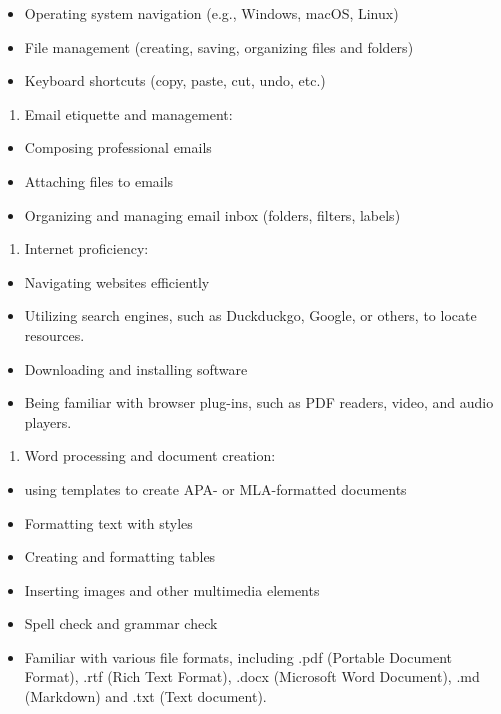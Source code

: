 \documentclass[
]{book}
\providecommand{\tightlist}{%
  \setlength{\itemsep}{0pt}\setlength{\parskip}{0pt}}
\theoremstyle{definition}
\theoremstyle{definition}
\theoremstyle{definition}
\theoremstyle{definition}
\theoremstyle{remark}
\begin{document}
\begin{itemize}
\tightlist
\item
  Operating system navigation (e.g., Windows, macOS, Linux)
\item
  File management (creating, saving, organizing files and folders)
\item
  Keyboard shortcuts (copy, paste, cut, undo, etc.)
\end{itemize}

\begin{enumerate}
\def\labelenumi{\arabic{enumi}.}
\setcounter{enumi}{1}
\tightlist
\item
  Email etiquette and management:
\end{enumerate}

\begin{itemize}
\tightlist
\item
  Composing professional emails
\item
  Attaching files to emails
\item
  Organizing and managing email inbox (folders, filters, labels)
\end{itemize}

\begin{enumerate}
\def\labelenumi{\arabic{enumi}.}
\setcounter{enumi}{2}
\tightlist
\item
  Internet proficiency:
\end{enumerate}

\begin{itemize}
\tightlist
\item
  Navigating websites efficiently
\item
  Utilizing search engines, such as Duckduckgo, Google, or others, to locate resources.\\
\item
  Downloading and installing software\\
\item
  Being familiar with browser plug-ins, such as PDF readers, video, and audio players.\\
\end{itemize}

\begin{enumerate}
\def\labelenumi{\arabic{enumi}.}
\setcounter{enumi}{3}
\tightlist
\item
  Word processing and document creation:
\end{enumerate}

\begin{itemize}
\tightlist
\item
  using templates to create APA- or MLA-formatted documents
\item
  Formatting text with styles
\item
  Creating and formatting tables
\item
  Inserting images and other multimedia elements
\item
  Spell check and grammar check
\item
  Familiar with various file formats, including .pdf (Portable Document Format), .rtf (Rich Text Format), .docx (Microsoft Word Document), .md (Markdown) and .txt (Text document).
\end{itemize}
\end{document}
